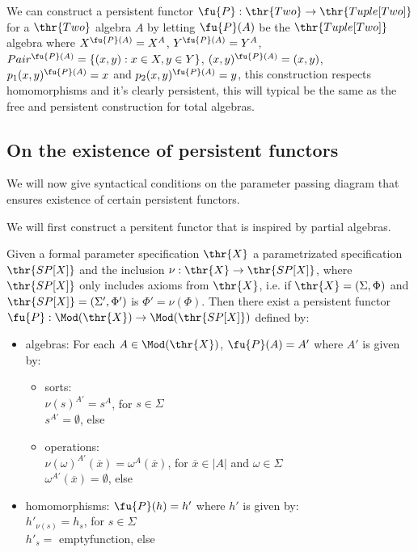 \begin{example}
We can construct a persistent functor $\fu{P}: \thr{Two} \to \thr{Tuple[Two]}$ for a $\thr{Two}$ algebra $A$ by letting $\fu{P}(A)$ be the $\thr{Tuple[Two]}$ algebra where $X^{\fu{P}(A)}= X^A$, $Y^{\fu{P}(A)}= Y^A$, $Pair^{\fu{P}(A)}= \{ (x,y): x \in X, y \in Y \}$, $(x,y)^{\fu{P}(A)}=(x,y)$, $p_1(x,y)^{\fu{P}(A)}=x$ and $p_2(x,y)^{\fu{P}(A)}=y$, this construction respects homomorphisms and it's clearly persistent, this will typical be the same as the free and persistent construction for total algebras.
\end{example}

\subsection{On the existence of persistent functors}
We will now give syntactical conditions on the parameter passing diagram that ensures existence of certain persistent functors.

We will first construct a persitent functor that is inspired by partial algebras.

\begin{proposition} Given a formal parameter specification $\thr{X}$ a parametrizated specification $\thr{SP[X]}$ and the inclusion $\nu:\thr{X} \to \thr{SP[X]}$, where $\thr{SP[X]}$ only includes axioms from $\thr{X}$, i.e. if $\thr{X}=(\Sigma,\Phi)$ and $\thr{SP[X]}=(\Sigma',\Phi')$ is $\Phi'= \nu(\Phi)$. Then there exist a persistent functor $\fu{P}:\Mod(\thr{X}) \to \Mod(\thr{SP[X]})$ defined by:
	\begin{itemize}
	\item algebras: For each $A \in \Mod(\thr{X})$,
	$\fu{P}(A) = A'$ where $A'$ is given by:
		\begin{itemize}
		\item sorts:\\
		$\nu(s)^{A'}= s^A$, for $s \in \Sigma$\\
		$s^{A'} = \emptyset$, else
		\item operations: \\
		$\nu(\omega)^{A'}(\overline{x})= \omega^A(\overline{x})$, for $\overline{x} \in |A|$ and $\omega \in \Sigma$\\
		$\omega^{A'}(\overline{x}) = \emptyset$, else
		\end{itemize}
	\item homomorphisms:
	$\fu{P}(h) = h'$ where $h'$ is given by:\\
		$h'_{\nu(s)} = h_s$, for $s \in \Sigma$\\
		$h'_s =$ emptyfunction, else
	\end{itemize}
\end{proposition}

